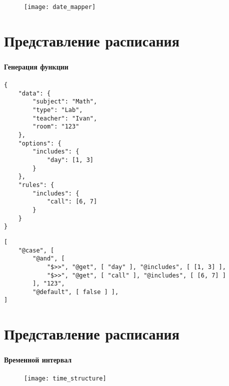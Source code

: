 \begin{frame}
\frametitle{\insertsection}

\begin{figure}
    \center
    \texttt{[image: date\_mapper]}
\end{figure}
\end{frame}


\section{Представление расписания}

\begin{frame}[fragile]
\frametitle{\insertsection}
\framesubtitle{Генерация функции}

    \begin{lstlisting}[basicstyle=\tiny]
{
    "data": {
        "subject": "Math",
        "type": "Lab",
        "teacher": "Ivan",
        "room": "123"
    },
    "options": {
        "includes": {
            "day": [1, 3]
        }
    },
    "rules": {
        "includes": {
            "call": [6, 7]
        }
    }
}
    \end{lstlisting}
\endminipage\hfill
{}
    \begin{lstlisting}[basicstyle=\tiny]
[
    "@case", [
        "@and", [
            "$>>", "@get", [ "day" ], "@includes", [ [1, 3] ],
            "$>>", "@get", [ "call" ], "@includes", [ [6, 7] ]
        ], "123",
        "@default", [ false ] ],
]
    \end{lstlisting}
\endminipage

\end{frame}


\section{Представление расписания}

\begin{frame}[fragile]
\frametitle{\insertsection}
\framesubtitle{Временной интервал}

\begin{figure}
    \center
    \texttt{[image: time\_structure]}
\end{figure}
\end{frame}

